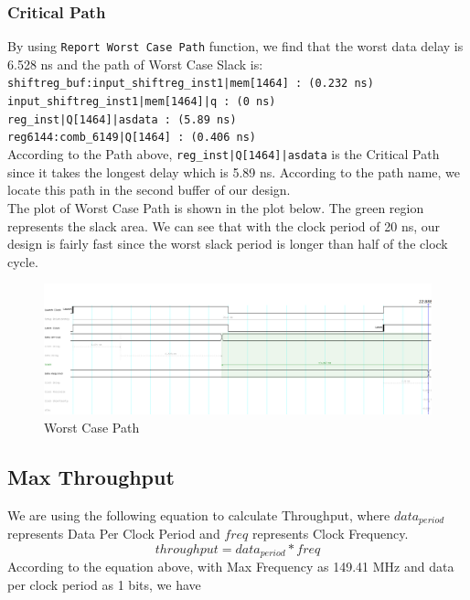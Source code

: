 \documentclass[letterpaper, 12pt]{article} %
\begin{document}
\subsubsection{Critical Path}
By using \texttt{Report Worst Case Path} function, we find that the worst data delay is 6.528 ns and the path of Worst Case Slack is: \\

\noindent \texttt{shiftreg\_buf:input\_shiftreg\_inst1|mem[1464] : (0.232 ns)}\\
\texttt{input\_shiftreg\_inst1|mem[1464]|q : (0 ns)}\\
\texttt{reg\_inst|Q[1464]|asdata : (5.89 ns)}\\
\texttt{reg6144:comb\_6149|Q[1464] : (0.406 ns)}\\

\noindent According to the Path above, \texttt{reg\_inst|Q[1464]|asdata} is the Critical Path since it takes the longest delay which is 5.89 ns. According to the path name, we locate this path in the second buffer of our design. \\

\noindent The plot of Worst Case Path is shown in the plot below. The green region represents the slack area. We can see that with the clock period of 20 ns, our design is fairly fast since the worst slack period is longer than half of the clock cycle. 
\begin{figure}[h!]
\centering
\includegraphics[scale=0.4]{pathpic2.PNG}
\caption{Worst Case Path}
\label{fig1}
\end{figure}

\subsection{Max Throughput}
We are using the following equation to calculate Throughput, where $data_{period}$ represents Data Per Clock Period and $freq$ represents Clock Frequency. 
\begin{equation}
    throughput = data_{period} * freq
\end{equation}
According to the equation above, with Max Frequency as 149.41 MHz and data per clock period as 1 bits, we have
\end{document}
